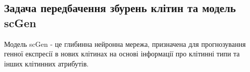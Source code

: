 \subsection{Задача передбачення збурень клітин та модель scGen}

{
\color{red}
Модель scGen - це глибинна нейронна мережа, призначена для прогнозування генної експресії в нових клітинах на основі інформації про клітинні типи та інших клітинних атрибутів.

}